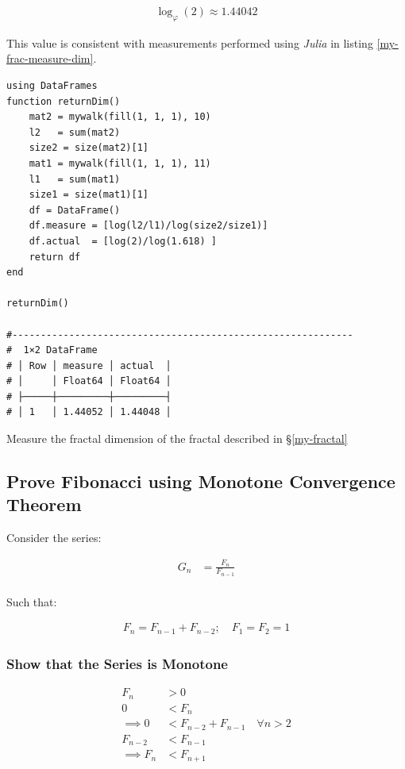 \documentclass[a4paper,11pt,twoside]{article}
\begin{document}
\begin{align}
\log_{\varphi}\left(2\right) \approx 1.44042
\end{align}

This value is consistent with measurements performed using \emph{Julia} in listing \ref{my-frac-measure-dim}.

\begin{listing}[htbp]
\begin{verbatim}
using DataFrames
function returnDim()
    mat2 = mywalk(fill(1, 1, 1), 10)
    l2   = sum(mat2)
    size2 = size(mat2)[1]
    mat1 = mywalk(fill(1, 1, 1), 11)
    l1   = sum(mat1)
    size1 = size(mat1)[1]
    df = DataFrame()
    df.measure = [log(l2/l1)/log(size2/size1)]
    df.actual  = [log(2)/log(1.618) ]
    return df
end

returnDim()

#------------------------------------------------------------
#  1×2 DataFrame
# │ Row │ measure │ actual  │
# │     │ Float64 │ Float64 │
# ├─────┼─────────┼─────────┤
# │ 1   │ 1.44052 │ 1.44048 │
\end{verbatim}
\caption{\label{my-frac-measure-dim}Measure the fractal dimension of the fractal described in \S \ref{my-fractal}}
\end{listing}



\subsection{Prove Fibonacci using Monotone Convergence Theorem}
\label{fib-golden-ratio-proof}
Consider the series:

$$\begin{aligned}
G_n &= \frac{F_{n} }{F_{n - 1} } \\
\end{aligned}$$

Such that:

$$\begin{aligned}
F_n = F_{n- 1} +  F_{n- 2} ; \quad F_1 = F_2 = 1
\end{aligned}$$


\subsubsection{Show that the Series is Monotone}
\label{sec:org28f72ba}
$$\begin{aligned}
F_{n} &> 0 \\
0 &< F_{n} \\
 \implies   0 &< F_{n - 2} +  F_{n- 1} \quad \forall n > 2 \\
  F_{n- 2} &< F_{n- 1}  \\
   \implies  F_n & < F_{n+1}
\end{aligned}$$
\end{document}
